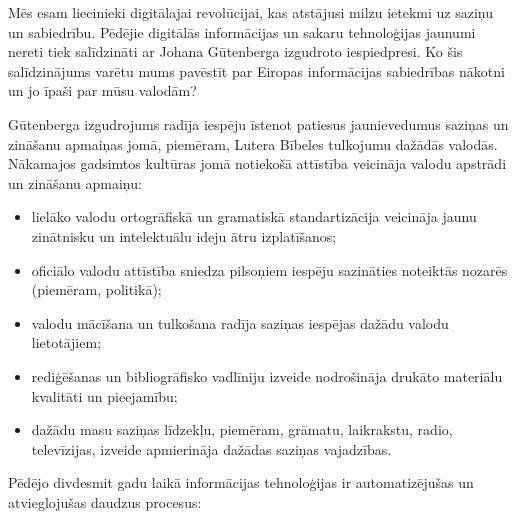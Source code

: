 \clearpage



\begin{multicols}{2}

Mēs esam liecinieki digitālajai revolūcijai, kas atstājusi milzu ietekmi uz saziņu un sabiedrību. 
Pēdējie digitālās informācijas un sakaru tehnoloģijas jaunumi nereti tiek salīdzināti ar Johana Gūtenberga izgudroto iespiedpresi. 
Ko šis salīdzinājums varētu mums pavēstīt par Eiropas informācijas sabiedrības nākotni un jo īpaši par mūsu valodām?


Gūtenberga izgudrojums radīja iespēju īstenot patiesus jaunievedumus saziņas un zināšanu apmaiņas jomā, piemēram, Lutera Bībeles tulkojumu dažādās valodās.  Nākamajos gadsimtos kultūras jomā notiekošā attīstība veicināja valodu apstrādi un zināšanu apmaiņu:

\begin{itemize}
\item  lielāko valodu ortogrāfiskā un gramatiskā standartizācija veicināja jaunu zinātnisku un intelektuālu ideju ātru izplatīšanos;
\item  oficiālo valodu attīstība sniedza pilsoņiem iespēju sazināties noteiktās nozarēs (piemēram, politikā);
\item  valodu mācīšana un tulkošana radīja saziņas iespējas dažādu valodu lietotājiem;
\item  rediģēšanas un bibliogrāfisko vadlīniju izveide nodrošināja drukāto materiālu kvalitāti un pieejamību;
\item  dažādu masu saziņas līdzekļu, piemēram, grāmatu, laikrakstu, radio, televīzijas, izveide apmierināja dažādas saziņas vajadzības.  
\end{itemize}

Pēdējo divdesmit gadu laikā informācijas tehnoloģijas ir automatizējušas un atvieglojušas daudzus procesus:


\end{multicols}
